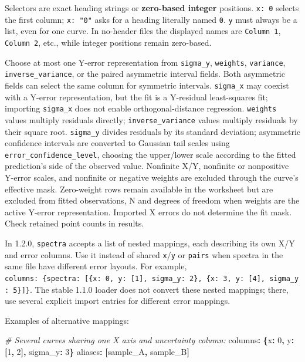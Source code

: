 \documentclass[
  10pt,
  a4paper,
  oneside]{scrreprt}
\newenvironment{Shaded}{}{}
\newcommand{\AttributeTok}[1]{\textcolor[rgb]{0.49,0.56,0.16}{#1}}
\newcommand{\CommentTok}[1]{\textcolor[rgb]{0.38,0.63,0.69}{\textit{#1}}}
\newcommand{\DecValTok}[1]{\textcolor[rgb]{0.25,0.63,0.44}{#1}}
\newcommand{\FunctionTok}[1]{\textcolor[rgb]{0.02,0.16,0.49}{#1}}
\newcommand{\KeywordTok}[1]{\textcolor[rgb]{0.00,0.44,0.13}{\textbf{#1}}}
\begin{document}
Selectors are exact heading strings or \textbf{zero-based integer}
positions. \texttt{x:\ 0} selects the first column; \texttt{x:\ "0"}
asks for a heading literally named \texttt{0}. \texttt{y} must always be
a list, even for one curve. In no-header files the displayed names are
\texttt{Column\ 1}, \texttt{Column\ 2}, etc., while integer positions
remain zero-based.

Choose at most one Y-error representation from \texttt{sigma\_y},
\texttt{weights}, \texttt{variance}, \texttt{inverse\_variance}, or the
paired asymmetric interval fields. Both asymmetric fields can select the
same column for symmetric intervals. \texttt{sigma\_x} may coexist with
a Y-error representation, but the fit is a Y-residual least-squares fit;
importing \texttt{sigma\_x} does not enable orthogonal-distance
regression. \texttt{weights} values multiply residuals directly;
\texttt{inverse\_variance} values multiply residuals by their square
root. \texttt{sigma\_y} divides residuals by its standard deviation;
asymmetric confidence intervals are converted to Gaussian tail scales
using \texttt{error\_confidence\_level}, choosing the upper/lower scale
according to the fitted prediction's side of the observed value.
Nonfinite X/Y, nonfinite or nonpositive Y-error scales, and nonfinite or
negative weights are excluded through the curve's effective mask.
Zero-weight rows remain available in the worksheet but are excluded from
fitted observations, N and degrees of freedom when weights are the
active Y-error representation. Imported X errors do not determine the
fit mask. Check retained point counts in results.

In 1.2.0, \texttt{spectra} accepts a list of nested mappings, each
describing its own X/Y and error columns. Use it instead of shared
\texttt{x}/\texttt{y} or \texttt{pairs} when spectra in the same file
have different error layouts. For example,
\texttt{columns:\ \{spectra:\ {[}\{x:\ 0,\ y:\ {[}1{]},\ sigma\_y:\ 2\},\ \{x:\ 3,\ y:\ {[}4{]},\ sigma\_y:\ 5\}{]}\}}.
The stable 1.1.0 loader does not convert these nested mappings; there,
use several explicit import entries for different error mappings.

Examples of alternative mappings:

\begin{Shaded}
\begin{Highlighting}[]
\CommentTok{\# Several curves sharing one X axis and uncertainty column:}
\FunctionTok{columns}\KeywordTok{:}\AttributeTok{ }\KeywordTok{\{}\FunctionTok{x}\KeywordTok{:}\AttributeTok{ }\DecValTok{0}\KeywordTok{,}\AttributeTok{ }\FunctionTok{y}\KeywordTok{:}\AttributeTok{ }\KeywordTok{[}\DecValTok{1}\KeywordTok{,}\AttributeTok{ }\DecValTok{2}\KeywordTok{],}\AttributeTok{ }\FunctionTok{sigma\_y}\KeywordTok{:}\AttributeTok{ }\DecValTok{3}\KeywordTok{\}}
\FunctionTok{aliases}\KeywordTok{:}\AttributeTok{ }\KeywordTok{[}\AttributeTok{sample\_A}\KeywordTok{,}\AttributeTok{ sample\_B}\KeywordTok{]}
\end{Highlighting}
\end{Shaded}
\end{document}
